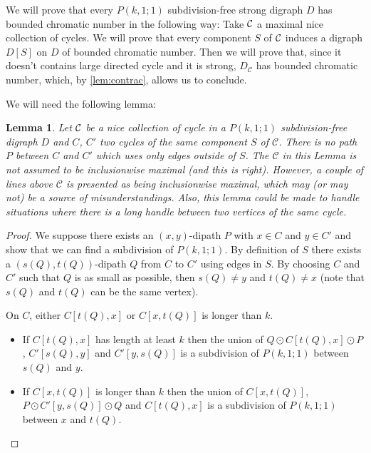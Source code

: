 \documentclass[utf8,10pt]{article}
\theoremstyle{plain}
\newtheorem{lemma}[theorem]{Lemma}
\theoremstyle{definition}
\theoremstyle{remark}
\newcommand{\nathann}[1]{{\color{blue}{\bf Nathann:} #1}}
\begin{document}
We will prove that every $P(k,1;1)$ subdivision-free strong digraph $D$ has bounded chromatic number in the following way:
Take ${\cal C}$ a maximal nice collection of cycles. 
We will prove that every component $S$ of ${\cal C}$ induces a digraph $D[S]$ on $D$ of bounded chromatic number. 
Then we will prove that, since it doesn't contains large directed cycle and it is strong, $D_{\mathcal{C}}$ has bounded chromatic number,
which, by \ref{lem:contrac}, allows us to conclude. 

We will need the following lemma:



\begin{lemma}\label{lem:headphone}
Let ${\cal C}$ be a nice collection of cycle in a $P(k,1;1)$ subdivision-free digraph $D$ and $C$, $C'$ two cycles of the same
component $S$ of $\mathcal{C}$. There is no path $P$ between $C$ and $C'$ which uses only edges outside of $S$. 
\nathann{The $\mathcal C$ in this Lemma is not assumed to be inclusionwise maximal (and this is right). However, a couple of lines above $\mathcal C$ is presented as being inclusionwise maximal, which may (or may not) be a source of misunderstandings.}
\nathann{Also, this lemma could be made to handle situations where there is a long handle between two vertices of the {\em same} cycle.}
\end{lemma}

\begin{proof}
We suppose there exists an $(x,y)$-dipath $P$ with $x \in C$ and $y \in C'$ and show that we can find a subdivision of $P(k,1;1)$. 
By definition of $S$ there exists a $(s(Q),t(Q))$-dipath $Q$ from $C$ to $C'$ using edges in $S$. By choosing $C$ and $C'$ such that 
$Q$ is as small as possible, then $s(Q) \not = y$ and $t(Q) \not = x$ (note that $s(Q)$ and $t(Q)$ can be the same vertex). 

On $C$, either $C[t(Q), x]$ or $C[x, t(Q)]$ is longer than $k$. 
\begin{itemize}
	\item If $C[t(Q), x]$ has length at least $k$ then the union of $Q \odot C[t(Q), x] \odot P$, $C'[s(Q), y]$ and $C'[ y, s(Q)]$
	is a subdivision of $P(k,1;1)$ between $s(Q)$ and $y$. 
	\item If $C[x, t(Q)]$ is longer than $k$ then the union of $C[x, t(Q)]$, $P \odot C'[y, s(Q)] \odot Q$ and $C[t(Q), x]$
	is a subdivision of $P(k,1;1)$ between $x$ and $t(Q)$. 
\end{itemize}
\end{proof}
\end{document}
